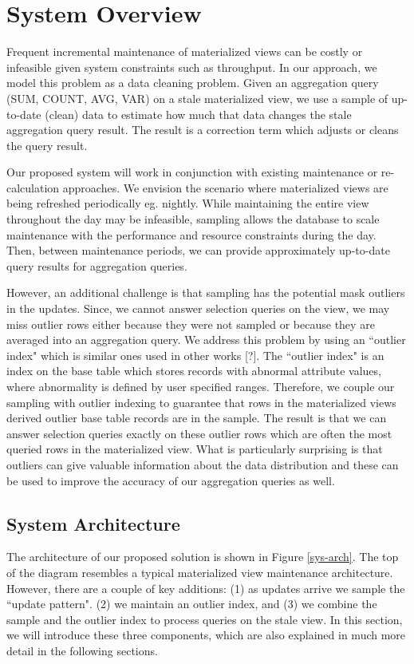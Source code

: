 \section{System Overview}
Frequent incremental maintenance of materialized views can be costly or infeasible given system constraints such as throughput.
In our approach, we model this problem as a data cleaning problem.
Given an aggregation query (SUM, COUNT, AVG, VAR) on a stale materialized view, we use a sample of up-to-date (clean) data to estimate how much that data changes the stale aggregation query result.
The result is a correction term which adjusts or cleans the query result.

Our proposed system will work in conjunction with existing maintenance or re-calculation approaches.
We envision the scenario where materialized views are being refreshed periodically eg. nightly.
While maintaining the entire view throughout the day may be infeasible, sampling allows the database to scale maintenance with the performance and resource constraints during the day.
Then, between maintenance periods, we can provide approximately up-to-date query results for aggregation queries.

However, an additional challenge is that sampling has the potential mask outliers in the updates.
Since, we cannot answer selection queries on the view, we may miss outlier rows either because they were not sampled or because
they are averaged into an aggregation query.
We address this problem by using an ``outlier index" which is similar ones used in other works [?].
The ``outlier index" is an index on the base table which stores records with abnormal attribute values, where abnormality is defined by user specified ranges.
Therefore, we couple our sampling with outlier indexing to guarantee that rows in the materialized views derived outlier base table records are in the sample.
The result is that we can answer selection queries exactly on these outlier rows which are often the most queried rows in the materialized view.
What is particularly surprising is that outliers can give valuable information about the data distribution and these can be used to improve the accuracy of our aggregation queries as well.

\subsection{System Architecture}
The architecture of our proposed solution is shown in Figure \ref{sys-arch}.
The top of the diagram resembles a typical materialized 
view maintenance architecture.
However, there are a couple of key additions: (1) as updates arrive we sample the ``update pattern". 
(2) we maintain an outlier index, and (3) we combine the sample and the outlier index to process queries on the stale view.
In this section, we will introduce these three components, which are also explained in much more detail in the following sections.

